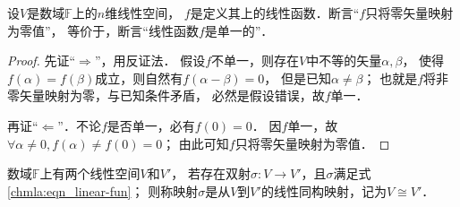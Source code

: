 \begin{proposition}\label{chmla:thm_OneOne}
    设$V$是数域$\mathbb{F}$上的$n$维线性空间，
    $f$是定义其上的线性函数．断言“$f$只将零矢量映射为零值”，
    等价于，断言“线性函数$f$是单一的”．
\end{proposition}
\begin{proof}
    先证“$\Rightarrow$”，用反证法．
    假设$f$不单一，则存在$V$中不等的矢量$\alpha,\beta$，
    使得$f(\alpha)=f(\beta)$成立，则自然有$f(\alpha-\beta)=0$，
    但是已知$\alpha \neq \beta$；
    也就是$f$将非零矢量映射为零，与已知条件矛盾，
    必然是假设错误，故$f$单一．

    再证“$\Leftarrow$”．不论$f$是否单一，必有$f(0)=0$．
    因$f$单一，故$\forall \alpha \neq 0, f(\alpha)\neq f(0)=0$；
    由此可知$f$只将零矢量映射为零值．
\end{proof}



\begin{definition}\label{chmla:def_isomorphism}
    数域$\mathbb{F}$上有两个线性空间$V$和$V'$，
    若存在双射$\sigma:V\to V'$，且$\sigma$满足式\eqref{chmla:eqn_linear-fun}；
    则称映射$\sigma$是从$V$到$V'$的{\heiti 线性同构映射}，记为$V \cong V'$．
\end{definition}

